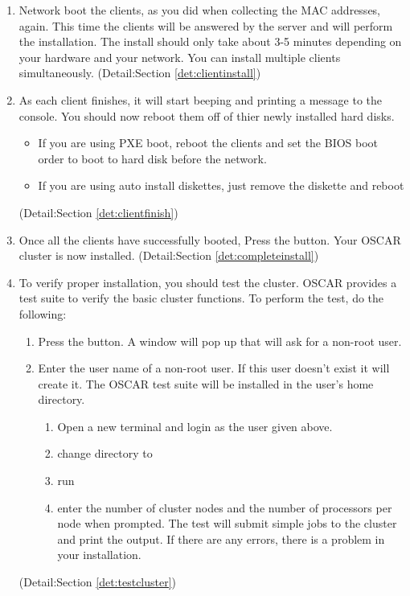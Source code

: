 \begin {enumerate}
\item Network boot the clients, as you did when collecting the MAC addresses,
again. This time the clients will be answered by the server and will perform
the installation. The install should only take about 3-5 minutes depending on 
your hardware and your network. You can install multiple clients simultaneously.
(Detail:Section \ref{det:clientinstall})

\item As each client finishes, it will start beeping and printing a message to the 
console. You should now reboot them off of thier newly installed hard disks.

        \begin{itemize}
        \item If you are using PXE boot, reboot the clients and set the BIOS
        boot order to boot to hard disk before the network.
        \item If you are using auto install diskettes, just remove the diskette
        and reboot
        \end{itemize}
(Detail:Section \ref{det:clientfinish})

\item Once all the clients have successfully booted, Press the 
 button. Your OSCAR cluster is
now installed.
(Detail:Section \ref{det:completeinstall})

\item To verify proper installation, you should test the cluster.
OSCAR provides a test suite to verify the basic cluster
functions. To perform the test, do the following:

        \begin{enumerate}
        \item Press the  button. A window will
        pop up that will ask for a non-root user. 
        \item Enter the user name of a non-root user. If this user doesn't
        exist it will create it. The OSCAR test suite will be installed
        in the user's home directory.
                \begin{enumerate}
                \item Open a new terminal and login as the user given above.
                \item change directory to 
                \item run 
                \item enter the number of cluster nodes and the number of 
                processors per node when prompted. The test will submit
                simple jobs to the cluster and print the output. If there
                are any errors, there is a problem in your installation.
                \end{enumerate}
         \end{enumerate}
(Detail:Section \ref{det:testcluster})

\end{enumerate}
